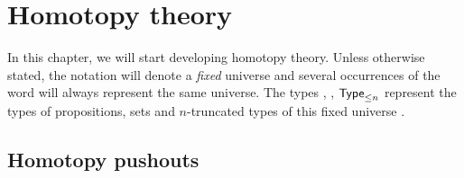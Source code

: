 
\newcommand{\typele}[1]{\ensuremath{\type_{\le #1}}\xspace}
\newcommand{\N}{\mathbb{N}}
\newcommand{\Nt}{\N_{-2}}
\newcommand{\function}[4]{\left\{\begin{array}{rcl}#1 &
      \longrightarrow & #2 \\ #3 & \longmapsto & #4 \end{array}\right.}
\newcommand{\anhprop}{a mere proposition\xspace}
\newcommand{\hprops}{mere propositions\xspace}
\newcommand{\funext}{\mathsf{funext}}
\newcommand{\happly}{\mathsf{happly}}


\renewcommand{\P}{\ensuremath{\mathsf{P}}\xspace}
\newcommand{\cocone}[2]{\mathrm{cocone}_{#1}(#2)}
\newcommand{\Ddiag}{\mathscr{D}}
\newcommand{\inl}{\mathsf{inl}}
\newcommand{\inr}{\mathsf{inr}}
\newcommand{\glue}{\mathsf{glue}}
\newcommand{\cone}[2]{\mathrm{cone}_{#1}(#2)}
\newcommand{\reflect}{\mathsf{r}}
\newcommand{\project}{\mathsf{p}}
\newcommand{\ext}{\mathsf{ext}}
\newcommand{\tproj}{\mathsf{proj}}
\newcommand{\extendsmb}{\mathsf{extend}}
\newcommand{\extend}[1]{\extendsmb(#1)}
\newcommand{\composecocone}[2]{#1\circ#2}
\newcommand{\composecone}[2]{#2\circ#1}

\chapter{Homotopy theory}
\label{cha:homotopy}

In this chapter, we will start developing homotopy theory. Unless otherwise
stated, the notation \type will denote a \emph{fixed} universe and several
occurrences of the word \type will always represent the same universe. The types
\prop, \set, \typele{n} represent the types of propositions, sets and
$n$-truncated types of this fixed universe \type.

\section{Homotopy pushouts}
\label{sec:pushouts}

